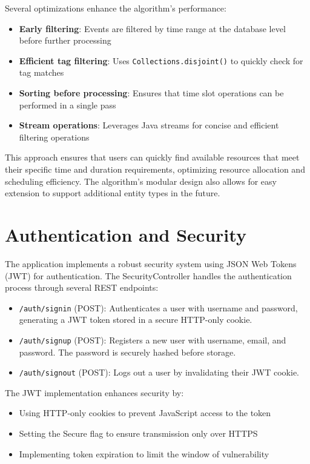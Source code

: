 Several optimizations enhance the algorithm's performance:

\begin{itemize}
    \item \textbf{Early filtering}: Events are filtered by time range at the database level before further processing
    \item \textbf{Efficient tag filtering}: Uses \texttt{Collections.disjoint()} to quickly check for tag matches
    \item \textbf{Sorting before processing}: Ensures that time slot operations can be performed in a single pass
    \item \textbf{Stream operations}: Leverages Java streams for concise and efficient filtering operations
\end{itemize}

This approach ensures that users can quickly find available resources that meet their specific time and duration requirements, optimizing resource allocation and scheduling efficiency.
The algorithm's modular design also allows for easy extension to support additional entity types in the future.

\section{Authentication and Security}\label{sec:authentication-and-security}

The application implements a robust security system using JSON Web Tokens (JWT) for authentication.
The SecurityController handles the authentication process through several REST endpoints:

\begin{itemize}
    \item \texttt{/auth/signin} (POST): Authenticates a user with username and password, generating a JWT token stored in a secure HTTP-only cookie.
    \item \texttt{/auth/signup} (POST): Registers a new user with username, email, and password.
    The password is securely hashed before storage.
    \item \texttt{/auth/signout} (POST): Logs out a user by invalidating their JWT cookie.
\end{itemize}

The JWT implementation enhances security by:
\begin{itemize}
    \item Using HTTP-only cookies to prevent JavaScript access to the token
    \item Setting the Secure flag to ensure transmission only over HTTPS
    \item Implementing token expiration to limit the window of vulnerability
\end{itemize}

